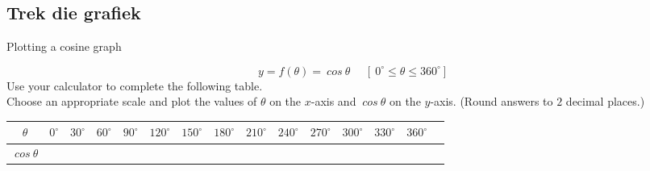 \subsection*{Trek die grafiek}
\begin{wex}
{Plotting a cosine graph}
{
\begin{equation*}
  y=f(\theta)=~cos~  \theta~~~~~~[~0^{\circ} \leq \theta \leq 360^{\circ}]
\end{equation*}
Use your calculator to complete the following table. \\
Choose an appropriate scale and plot the values of
$\theta$ on the $x$-axis and $~cos~\theta$ on the $y$-axis. (Round
answers to $2$ decimal places.)

\begin{table}[H]
\begin{center}
\begin{tabular}{|c|m{0.3cm}|m{0.3cm}|m{0.3cm}|m{0.5cm}|m{0.5cm}|m{0.5cm}|m{0.5cm}|m{0.5cm}|m{0.5cm}|m{0.5cm}|m{0.5cm}|m{0.5cm}|m{0.5cm}|} \hline

\footnotesize$\theta $&
\footnotesize$0^{\circ }$&
\footnotesize$30^{\circ }$&
\footnotesize$60^{\circ }$&
\footnotesize$90^{\circ }$&
\footnotesize$120^{\circ }$&
\footnotesize$150^{\circ }$&
\footnotesize$180^{\circ }$&
\footnotesize$210^{\circ }$&
\footnotesize$240^{\circ }$&
\footnotesize$270^{\circ }$&
\footnotesize$300^{\circ }$&
\footnotesize$330^{\circ }$&
\footnotesize$360^{\circ }$
\\ \hline

\footnotesize$~cos~\theta $&
&
&
&
&
&
&
&
&
&
&
&
&
&

 \hline
\end{tabular}
\end{center}
\end{table}
}
{
\begin{table}[H]

\begin{center}


\end{center}
\end{table}}
\end{wex}
